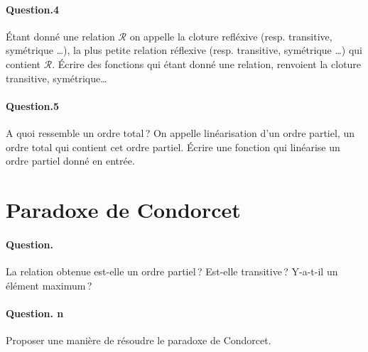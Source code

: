 \documentclass[10pt,a4paper]{article}
\begin{document}
\paragraph{Question.4\\}
Étant donné une relation $\mathcal{R}$ on appelle la cloture refléxive (resp. transitive,
symétrique \dots), la plus petite relation réflexive (resp. transitive,
symétrique \dots) qui contient $\mathcal{R}$. Écrire des fonctions qui
étant donné une relation, renvoient la cloture transitive, symétrique\dots

\paragraph{Question.5\\}
A quoi ressemble un ordre total\,? On appelle linéarisation d'un ordre
partiel, un ordre total qui contient cet ordre partiel. Écrire une
fonction qui linéarise un ordre partiel donné en entrée.
 
\section{Paradoxe de Condorcet}

\paragraph{Question. \\}
La relation obtenue est-elle un ordre partiel\,? Est-elle transitive\,?
Y-a-t-il un élément maximum\,?

\paragraph{Question. n\\}
Proposer une manière de résoudre le paradoxe de Condorcet.
\end{document}
